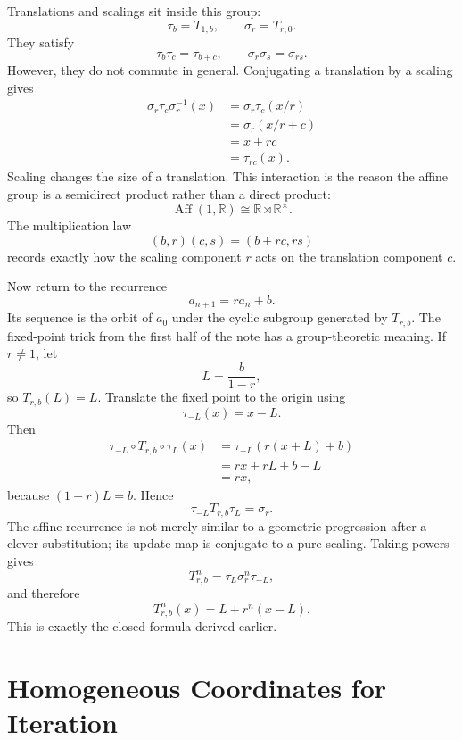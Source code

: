 Translations and scalings sit inside this group:
\[
  \tau_b=T_{1,b},
  \qquad
  \sigma_r=T_{r,0}.
\]
They satisfy
\[
  \tau_b\tau_c=\tau_{b+c},
  \qquad
  \sigma_r\sigma_s=\sigma_{rs}.
\]
However, they do not commute in general.  Conjugating a translation by a scaling gives
\[
\begin{aligned}
  \sigma_r\tau_c\sigma_r^{-1}(x)
  &=\sigma_r\tau_c(x/r)\\
  &=\sigma_r(x/r+c)\\
  &=x+rc\\
  &=\tau_{rc}(x).
\end{aligned}
\]
Scaling changes the size of a translation.  This interaction is the reason the affine group is a semidirect product rather than a direct product:
\[
  \operatorname{Aff}(1,\mathbb R)
  \cong \mathbb R\rtimes\mathbb R^{\times}.
\]
The multiplication law
\[
  (b,r)(c,s)=(b+rc,rs)
\]
records exactly how the scaling component \(r\) acts on the translation component \(c\).

Now return to the recurrence
\[
  a_{n+1}=ra_n+b.
\]
Its sequence is the orbit of \(a_0\) under the cyclic subgroup generated by \(T_{r,b}\).  The fixed-point trick from the first half of the note has a group-theoretic meaning.  If \(r\neq1\), let
\[
  L=\frac{b}{1-r},
\]
so \(T_{r,b}(L)=L\).  Translate the fixed point to the origin using
\[
  \tau_{-L}(x)=x-L.
\]
Then
\[
\begin{aligned}
  \tau_{-L}\circ T_{r,b}\circ\tau_L(x)
  &=\tau_{-L}(r(x+L)+b)\\
  &=rx+rL+b-L\\
  &=rx,
\end{aligned}
\]
because \((1-r)L=b\).  Hence
\[
  \tau_{-L}T_{r,b}\tau_L=\sigma_r.
\]
The affine recurrence is not merely similar to a geometric progression after a clever substitution; its update map is conjugate to a pure scaling.  Taking powers gives
\[
  T_{r,b}^n
  =\tau_L\sigma_r^n\tau_{-L},
\]
and therefore
\[
  T_{r,b}^n(x)=L+r^n(x-L).
\]
This is exactly the closed formula derived earlier.

\section{Homogeneous Coordinates for Iteration}

